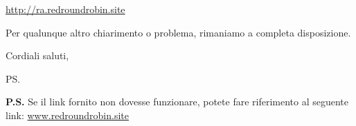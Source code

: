 \documentclass[12pt]{letter}
\begin{document}
\begin{letter}{ }
\begin{center}
\href{https://drive.google.com/drive/folders/1Bgp4GlxOqch6fmSjvgfuCC3z8yf3zROB?usp=sharing}{http://ra.redroundrobin.site}
\end{center}


Per qualunque altro chiarimento o problema, rimaniamo a completa disposizione.

\closing{Cordiali saluti,}


\vspace{3em}
\ps

\textbf{P.S.} Se il link fornito non dovesse funzionare, potete fare riferimento al seguente link:
\href{https://www.redroundrobin.site}{www.redroundrobin.site}

\end{letter}
\end{document}
